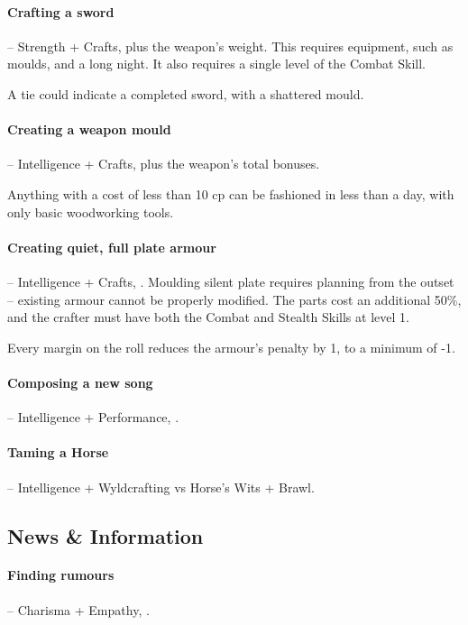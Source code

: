 \begin{multicols}{2}
\paragraph{Crafting a sword} -- Strength + Crafts,  plus the weapon's \gls{weight}.
This requires equipment, such as moulds, and a long night.
It also requires a single level of the Combat Skill.

A tie could indicate a completed sword, with a shattered mould.

\paragraph{Creating a weapon mould} -- Intelligence + Crafts,  plus the weapon's total bonuses.

Anything with a cost of less than 10 \gls{cp} can be fashioned in less than a day, with only basic woodworking tools.

\paragraph{Creating quiet, full plate armour} -- Intelligence + Crafts, .
Moulding silent plate requires planning from the outset -- existing armour cannot be properly modified.
The parts cost an additional 50\%, and the crafter must have both the Combat and Stealth Skills at level 1.

Every margin on the roll reduces the armour's penalty by 1, to a minimum of -1.

\paragraph{Composing a new song} -- Intelligence + Performance, .

\paragraph{Taming a Horse} -- Intelligence + Wyldcrafting vs Horse's Wits + Brawl.

\subsection{News \& Information}

\paragraph{Finding rumours} -- Charisma + Empathy, .


\end{multicols}
